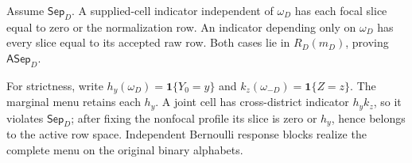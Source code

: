 Assume \(\mathsf{Sep}_D\).  A supplied-cell indicator independent of \(\omega_D\) has each focal slice equal to zero or the normalization row.  An indicator depending only on \(\omega_D\) has every slice equal to its accepted raw row.  Both cases lie in \(R_D(m_D)\), proving \(\mathsf{ASep}_D\).

For strictness, write \(h_y(\omega_D)=\mathbf1\{Y_0=y\}\) and \(k_z(\omega_{-D})=\mathbf1\{Z=z\}\).  The marginal menu retains each \(h_y\).  A joint cell has cross-district indicator \(h_yk_z\), so it violates \(\mathsf{Sep}_D\); after fixing the nonfocal profile its slice is zero or \(h_y\), hence belongs to the active row space.  Independent Bernoulli response blocks realize the complete menu on the original binary alphabets.